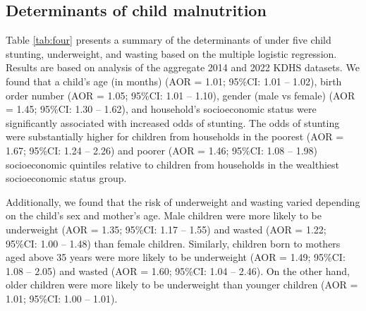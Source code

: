 \documentclass[sn-basic,Numbered,pdflatex]{sn-jnl}
\theoremstyle{remark}
\theoremstyle{definition}
\begin{document}
\hypertarget{determinants-of-child-malnutrition}{%
\subsection{Determinants of child
malnutrition}\label{determinants-of-child-malnutrition}}

Table \ref{tab:four} presents a summary of the determinants of under
five child stunting, underweight, and wasting based on the multiple
logistic regression. Results are based on analysis of the aggregate 2014
and 2022 KDHS datasets. We found that a child's age (in months) (AOR =
1.01; 95\%CI: 1.01 -- 1.02), birth order number (AOR = 1.05; 95\%CI:
1.01 -- 1.10), gender (male vs female) (AOR = 1.45; 95\%CI: 1.30 --
1.62), and household's socioeconomic status were significantly
associated with increased odds of stunting. The odds of stunting were
substantially higher for children from households in the poorest (AOR =
1.67; 95\%CI: 1.24 -- 2.26) and poorer (AOR = 1.46; 95\%CI: 1.08 --
1.98) socioeconomic quintiles relative to children from households in
the wealthiest socioeconomic status group.

Additionally, we found that the risk of underweight and wasting varied
depending on the child's sex and mother's age. Male children were more
likely to be underweight (AOR = 1.35; 95\%CI: 1.17 -- 1.55) and wasted
(AOR = 1.22; 95\%CI: 1.00 -- 1.48) than female children. Similarly,
children born to mothers aged above 35 years were more likely to be
underweight (AOR = 1.49; 95\%CI: 1.08 -- 2.05) and wasted (AOR = 1.60;
95\%CI: 1.04 -- 2.46). On the other hand, older children were more
likely to be underweight than younger children (AOR = 1.01; 95\%CI: 1.00
-- 1.01).
\end{document}
